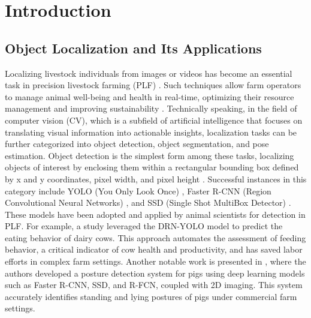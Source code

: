\section{Introduction}

\subsection*{Object Localization and Its Applications}

Localizing livestock individuals from images or videos has become an essential task in precision livestock farming (PLF) \cite{fernandes2020image}. Such techniques allow farm operators to manage animal well-being and health in real-time, optimizing their resource management and improving sustainability \cite{morrone2022industry, hao2023cattle}. Technically speaking, in the field of computer vision (CV), which is a subfield of artificial intelligence that focuses on translating visual information into actionable insights, localization tasks can be further categorized into object detection, object segmentation, and pose estimation. Object detection is the simplest form among these tasks, localizing objects of interest by enclosing them within a rectangular bounding box defined by x and y coordinates, pixel width, and pixel height \cite{viola2001rapid}. Successful instances in this category include YOLO (You Only Look Once) \cite{redmon2016you}, Faster R-CNN (Region Convolutional Neural Networks) \cite{girshick2015fast}, and SSD (Single Shot MultiBox Detector) \cite{liu2016ssd}. These models have been adopted and applied by animal scientists for detection in PLF. For example, a study \cite{yu2022automatic} leveraged the DRN-YOLO model \cite{xu2020improved} to predict the eating behavior of dairy cows. This approach automates the assessment of feeding behavior, a critical indicator of cow health and productivity, and has saved labor efforts in complex farm settings. Another notable work is presented in \cite{nasirahmadi2019deep}, where the authors developed a posture detection system for pigs using deep learning models such as Faster R-CNN, SSD, and R-FCN, coupled with 2D imaging. This system accurately identifies standing and lying postures of pigs under commercial farm settings.

